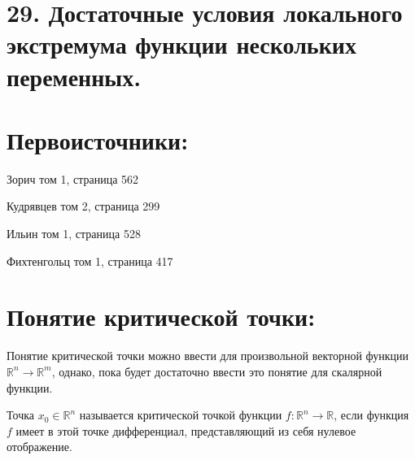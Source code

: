 


\section{29. Достаточные условия локального экстремума функции нескольких переменных.}
\section*{Первоисточники:}
\parindent=0cm
Зорич том 1, страница 562

Кудрявцев том 2, страница 299

Ильин том 1, страница 528

Фихтенгольц том 1, страница 417

\section*{Понятие критической точки:}

Понятие критической точки можно ввести для произвольной векторной функции $\mathbb{R}^n \to \mathbb{R}^m$, однако, пока будет достаточно ввести это понятие для скалярной функции. 

\begin{definition}
Точка $x_0 \in \mathbb{R}^n$ называется критической точкой функции $f: \mathbb{R}^n \to \mathbb{R}$, если функция $f$ имеет в этой точке дифференциал, представляющий из себя нулевое отображение.
\end{definition}
